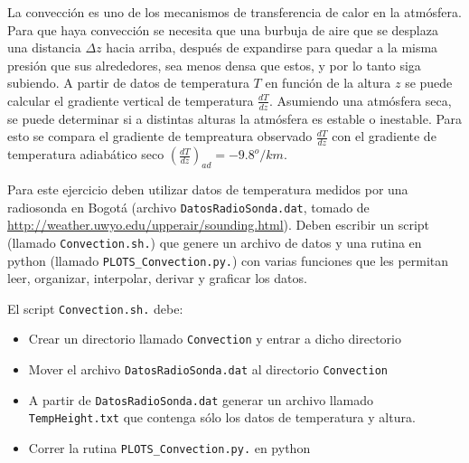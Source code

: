 \documentclass[11pt,letterpaper]{exam}
\begin{document}
\begin{questions}
\newpage


La convección es uno de los mecanismos de transferencia de calor en la atmósfera. Para que haya convección se necesita que una burbuja de aire que se desplaza una distancia $\Delta z$ hacia arriba, después de expandirse para quedar a la misma presión que sus alrededores, sea menos densa que estos, y por lo tanto siga subiendo. A partir de datos de temperatura $T$ en función de la altura $z$ se puede calcular el gradiente vertical de temperatura $\frac{dT}{dz}$. Asumiendo una atmósfera seca, se puede determinar si a distintas alturas la atmósfera es estable o inestable. Para esto se compara el gradiente de tempreatura observado $\frac{dT}{dz}$ con el gradiente de temperatura adiabático seco $(\frac{dT}{dz})_{ad}=-9.8^{o}/km$.
 
Para este ejercicio deben utilizar datos de temperatura medidos por una radiosonda en Bogotá (archivo \verb"DatosRadioSonda.dat", tomado de \url{http://weather.uwyo.edu/upperair/sounding.html}). Deben escribir un script (llamado \verb"Convection.sh.") que genere un archivo de datos y una rutina en python (llamado \verb"PLOTS_Convection.py.") con varias funciones que les permitan leer, organizar, interpolar, derivar y graficar los datos.

El script  \verb"Convection.sh." debe:
\begin{itemize}
\item{Crear un directorio llamado \verb"Convection" y entrar a dicho directorio}
\item{Mover el archivo \verb"DatosRadioSonda.dat" al directorio \verb"Convection"}
\item{A partir de \verb"DatosRadioSonda.dat" generar un archivo llamado \verb"TempHeight.txt" que contenga sólo los datos de temperatura y altura.}
\item{Correr la rutina \verb"PLOTS_Convection.py." en python}
\end{itemize}


\end{questions}
\end{document}
